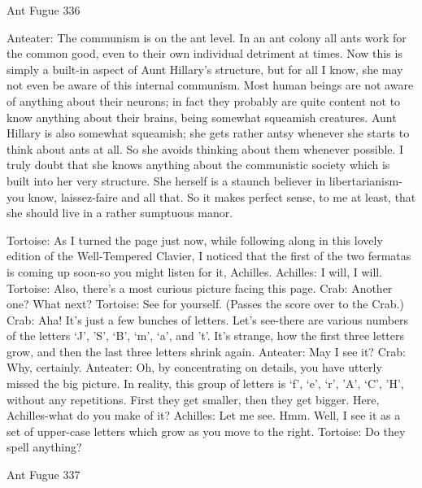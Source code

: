Ant Fugue                                                                                 336

Anteater: The communism is on the ant level. In an ant colony all ants work for the
   common good, even to their own individual detriment at times. Now this is simply a
   built-in aspect of Aunt Hillary's structure, but for all I know, she may not even be
   aware of this internal communism. Most human beings are not aware of anything
   about their neurons; in fact they probably are quite content not to know anything
   about their brains, being somewhat squeamish creatures. Aunt Hillary is also
   somewhat squeamish; she gets rather antsy whenever she starts to think about ants at
   all. So she avoids thinking about them whenever possible. I truly doubt that she
   knows anything about the communistic society which is built into her very structure.
   She herself is a staunch believer in libertarianism-you know, laissez-faire and all that.
   So it makes perfect sense, to me at least, that she should live in a rather sumptuous
   manor.




Tortoise: As I turned the page just now, while following along in this lovely edition of
    the Well-Tempered Clavier, I noticed that the first of the two fermatas is coming up
    soon-so you might listen for it, Achilles. Achilles: I will, I will.
Tortoise: Also, there's a most curious picture facing this page. Crab: Another one? What
    next?
Tortoise: See for yourself. (Passes the score over to the Crab.)
Crab: Aha! It's just a few bunches of letters. Let's see-there are various numbers of the
    letters `J', 'S', `B', `m', `a', and 't'. It's strange, how the first three letters grow, and then
    the last three letters shrink again. Anteater: May I see it?
Crab: Why, certainly.
Anteater: Oh, by concentrating on details, you have utterly missed the big picture. In
    reality, this group of letters is `f', `e', `r', 'A', `C', 'H', without any repetitions. First
    they get smaller, then they get bigger. Here, Achilles-what do you make of it?
Achilles: Let me see. Hmm. Well, I see it as a set of upper-case letters which grow as you
    move to the right.
Tortoise: Do they spell anything?




Ant Fugue                                                                                        337

